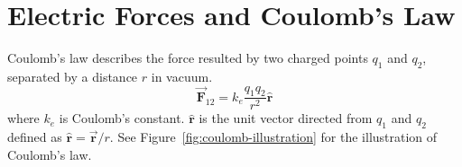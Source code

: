 \section{Electric Forces and Coulomb's Law}
Coulomb's law describes the force resulted by two charged points $q_1$ and $q_2$, separated by a distance $r$ in vacuum.
\begin{equation}
  \vec{\boldsymbol{F}}_{12} = k_e \frac{q_1q_2}{r^2}\hat{\boldsymbol{r}}
\end{equation}
where $k_e$ is Coulomb's constant. $\hat{\boldsymbol{r}}$ is the unit vector directed from $q_1$ and $q_2$ defined as $\hat{\boldsymbol{r}}=\vec{\boldsymbol{r}}/r$.
See Figure~\ref{fig:coulomb-illustration} for the illustration of Coulomb's law.

